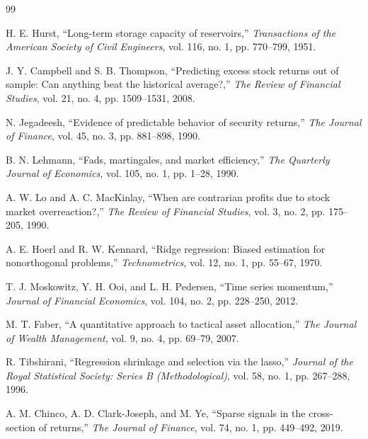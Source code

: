 \documentclass[11pt, a4paper]{article}
\begin{document}
\newpage
{}
\begin{thebibliography}{99}
\small
\setlength{\itemsep}{0.25em}

 H. E. Hurst, ``Long-term storage capacity of reservoirs,'' \textit{Transactions of the American Society of Civil Engineers}, vol. 116, no. 1, pp. 770--799, 1951.

 J. Y. Campbell and S. B. Thompson, ``Predicting excess stock returns out of sample: Can anything beat the historical average?,'' \textit{The Review of Financial Studies}, vol. 21, no. 4, pp. 1509--1531, 2008.

 N. Jegadeesh, ``Evidence of predictable behavior of security returns,'' \textit{The Journal of Finance}, vol. 45, no. 3, pp. 881--898, 1990.

 B. N. Lehmann, ``Fads, martingales, and market efficiency,'' \textit{The Quarterly Journal of Economics}, vol. 105, no. 1, pp. 1--28, 1990.

 A. W. Lo and A. C. MacKinlay, ``When are contrarian profits due to stock market overreaction?,'' \textit{The Review of Financial Studies}, vol. 3, no. 2, pp. 175--205, 1990.

 A. E. Hoerl and R. W. Kennard, ``Ridge regression: Biased estimation for nonorthogonal problems,'' \textit{Technometrics}, vol. 12, no. 1, pp. 55--67, 1970.

 T. J. Moskowitz, Y. H. Ooi, and L. H. Pedersen, ``Time series momentum,'' \textit{Journal of Financial Economics}, vol. 104, no. 2, pp. 228--250, 2012.

 M. T. Faber, ``A quantitative approach to tactical asset allocation,'' \textit{The Journal of Wealth Management}, vol. 9, no. 4, pp. 69--79, 2007.

 R. Tibshirani, ``Regression shrinkage and selection via the lasso,'' \textit{Journal of the Royal Statistical Society: Series B (Methodological)}, vol. 58, no. 1, pp. 267--288, 1996.

 A. M. Chinco, A. D. Clark-Joseph, and M. Ye, ``Sparse signals in the cross-section of returns,'' \textit{The Journal of Finance}, vol. 74, no. 1, pp. 449--492, 2019.


\end{thebibliography}
\end{document}
